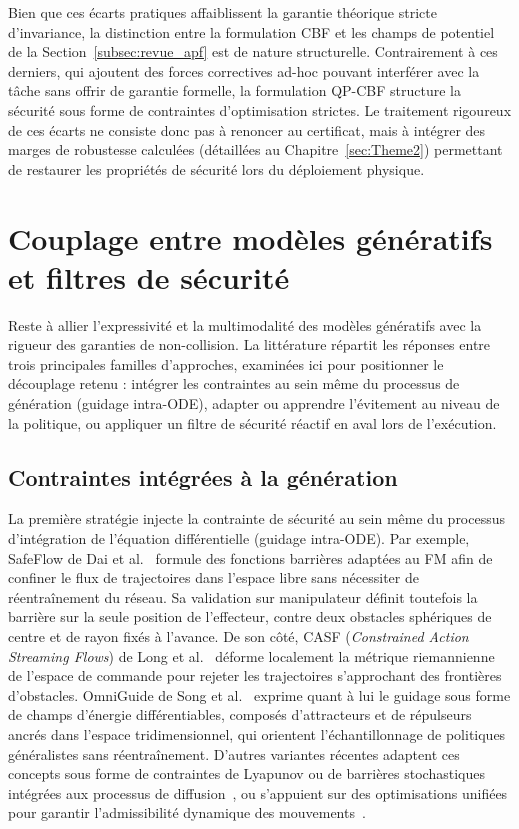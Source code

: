 Bien que ces écarts pratiques affaiblissent la garantie théorique stricte d'invariance, la distinction entre la formulation \ac{CBF} et les champs de potentiel de la Section~\ref{subsec:revue_apf} est de nature structurelle. Contrairement à ces derniers, qui ajoutent des forces correctives ad-hoc pouvant interférer avec la tâche sans offrir de garantie formelle, la formulation \ac{QP}-\ac{CBF} structure la sécurité sous forme de contraintes d'optimisation strictes. Le traitement rigoureux de ces écarts ne consiste donc pas à renoncer au certificat, mais à intégrer des marges de robustesse calculées (détaillées au Chapitre~\ref{sec:Theme2}) permettant de restaurer les propriétés de sécurité lors du déploiement physique.


\section{Couplage entre modèles génératifs et filtres de sécurité}

Reste à allier l'expressivité et la multimodalité des modèles génératifs avec la rigueur des garanties de non-collision. La littérature répartit les réponses entre trois principales familles d'approches, examinées ici pour positionner le découplage retenu : intégrer les contraintes au sein même du processus de génération (guidage intra-\ac{ODE}), adapter ou apprendre l'évitement au niveau de la politique, ou appliquer un filtre de sécurité réactif en aval lors de l'exécution.

\subsection{Contraintes intégrées à la génération}
La première stratégie injecte la contrainte de sécurité au sein même du processus d'intégration de l'équation différentielle (guidage intra-\ac{ODE}). Par exemple, SafeFlow de Dai et al.~\cite{Dai2025Safeflow} formule des fonctions barrières adaptées au \ac{FM} afin de confiner le flux de trajectoires dans l'espace libre sans nécessiter de réentraînement du réseau. Sa validation sur manipulateur définit toutefois la barrière sur la seule position de l'effecteur, contre deux obstacles sphériques de centre et de rayon fixés à l'avance. De son côté, CASF (\textit{Constrained Action Streaming Flows}) de Long et al.~\cite{Long2026Constraining} déforme localement la métrique riemannienne de l'espace de commande pour rejeter les trajectoires s'approchant des frontières d'obstacles. OmniGuide de Song et al.~\cite{Song2026Omniguide} exprime quant à lui le guidage sous forme de champs d'énergie différentiables, composés d'attracteurs et de répulseurs ancrés dans l'espace tridimensionnel, qui orientent l'échantillonnage de politiques généralistes sans réentraînement. D'autres variantes récentes adaptent ces concepts sous forme de contraintes de Lyapunov ou de barrières stochastiques intégrées aux processus de diffusion~\cite{Mizuta2024Cobl}, ou s'appuient sur des optimisations unifiées pour garantir l'admissibilité dynamique des mouvements~\cite{Yang2026Uniconflow,Huang2026Sad,Mizuta2026Unified}.

